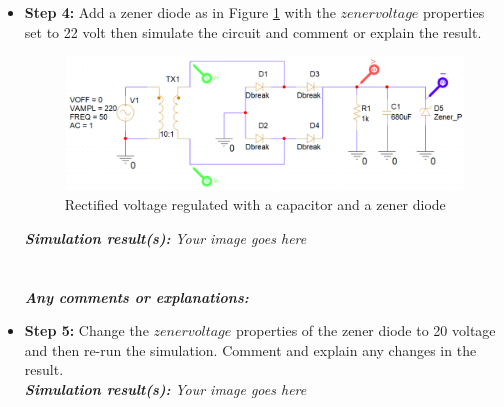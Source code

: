\begin{itemize}
          \dotfill\bigskip\par\mbox{}\dotfill
          \dotfill\bigskip\par\mbox{}\dotfill
          \dotfill\bigskip\par\mbox{}\dotfill
          \dotfill\bigskip\par\mbox{}\dotfill
    \item \textbf{Step 4:} Add a zener diode as in Figure \ref{lab2_ex9_step3} with the $zener voltage$ properties set to 22 volt then simulate the circuit and comment or explain the result.
          \begin{figure}[H]
              \centering
              \includegraphics[width=\linewidth]{source/content/lab2_ex9_step3.png}
              \caption{Rectified voltage regulated with a capacitor and a zener diode}
              \label{lab2_ex9_step3}
          \end{figure}
          \textit{\textbf{Simulation result(s):}} \textit{Your image goes here}\\
          \\
          \vspace{8cm}
          \\
          \textbf{\textit{Any comments or explanations:}}
          \dotfill\bigskip\par\mbox{}\dotfill
          \dotfill\bigskip\par\mbox{}\dotfill
          \dotfill\bigskip\par\mbox{}\dotfill
          \dotfill\bigskip\par\mbox{}\dotfill
          \dotfill\bigskip\par\mbox{}\dotfill
          \dotfill\bigskip\par\mbox{}\dotfill
    \item \textbf{Step 5:} Change the $zener voltage$ properties of the zener diode to 20 voltage and then re-run the simulation. Comment and explain any changes in the result.\\
          \textit{\textbf{Simulation result(s):}} \textit{Your image goes here}\\

\end{itemize}
